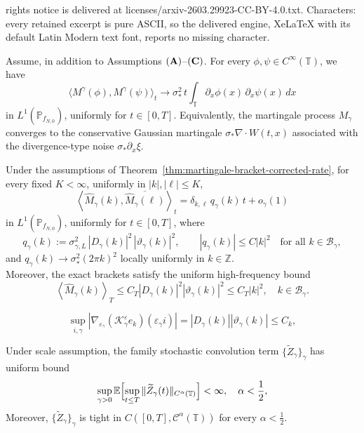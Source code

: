 \documentclass[10pt,a4paper]{amsart}
\begin{document}
rights notice is delivered at licenses/arxiv-2603.29923-CC-BY-4.0.txt. Characters: every retained excerpt is pure ASCII, so the delivered engine, XeLaTeX with its default Latin Modern text font, reports no missing character.
\begin{theorem}\label{thm:martingale-bracket-corrected-rate}
Assume, in addition to Assumptions \(({\bf A})\)--\(({\bf C})\).
For every \(\phi,\psi\in C^\infty(\mathbb T)\), we have
\[
\langle M^\gamma(\phi),M^\gamma(\psi)\rangle_t
\longrightarrow
\sigma_*^2\,t\int_{\mathbb T}\partial_x\phi(x)\,\partial_x\psi(x)\,dx
\]
in \(L^1(\mathbb P_{f_{N,0}})\), uniformly for \(t\in[0,T]\).
Equivalently, the martingale process $M_{\gamma}$ converges to the conservative Gaussian martingale $\sigma_*\nabla\cdot W(t,x)$ associated with the divergence-type noise $\sigma_*\partial_x\xi$.
\end{theorem}

\begin{lemma}\label{lem:Fourier-mode-bracket-final}
Under the assumptions of Theorem~\ref{thm:martingale-bracket-corrected-rate},
for every fixed \(K<\infty\), uniformly in
\(|k|,|\ell|\le K\),
\[
\left\langle \widehat M_\gamma(k),\overline{\widehat M_\gamma(\ell)}\right\rangle_t
=
\delta_{k,\ell}\,q_\gamma(k)\,t
+
o_\gamma(1)
\]
in \(L^1(\mathbb P_{f_{N,0}})\), uniformly for \(t\in[0,T]\), where
\[
q_\gamma(k)
:=
\sigma_{\gamma,L}^2\,|D_\gamma(k)|^2\,|\vartheta_\gamma(k)|^2,
\qquad
|q_\gamma(k)|\le C|k|^2
\quad\text{for all }k\in\mathcal B_\gamma,
\]
and
\(
q_\gamma(k) \rightarrow \sigma_*^2(2\pi k)^2
\)
locally uniformly in \(k\in\mathbb Z\).\\
Moreover, the exact brackets satisfy the uniform high-frequency bound
\begin{equation}\label{eq:fourier-mode-bracket-uniform-bound}
\left\langle \widehat M_\gamma(k)\right\rangle_T
\le C_T |D_\gamma(k)|^2|\vartheta_\gamma(k)|^2
\le C_T |k|^2,
\quad k\in\mathcal B_\gamma.
\end{equation}
\end{lemma}

\begin{equation}\label{E:jumpc}
    \sup_{i,\gamma}|\nabla_{\varepsilon_\gamma}(\mathcal K_\gamma^\varepsilon e_k)(\varepsilon_\gamma i)| =  |D_\gamma(k)||\vartheta_\gamma(k)| \leq C_k,
\end{equation}

\begin{lemma}\label{lemma:ZgammaE}
Under scale assumption, the family stochastic convolution term \(\{\widetilde Z_\gamma\}_\gamma\) has uniform bound
\begin{align}\label{E:UZ_gamma}
    \sup_{\gamma >0 } \mathbb E
\Bigl[
\sup_{t\le T}\|\widetilde Z_\gamma(t)\|_{C^\alpha(\mathbb T)}
\Bigr]  <\infty, \quad \alpha <\frac{1}{2},
\end{align}
Moreover, \(\{\widetilde Z_\gamma\}_\gamma\) is tight in
\(
C([0,T],\mathcal C^\alpha(\mathbb T))
\)
for every \(\alpha<\frac12\).
\end{lemma}
\end{document}
